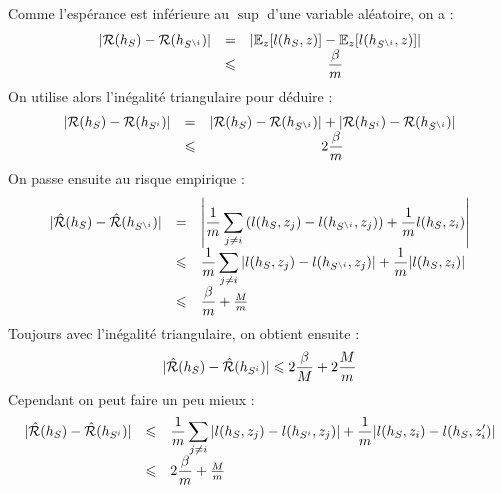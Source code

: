
\dem
Comme l'espérance est inférieure au $\sup$ d'une variable aléatoire, on a :
$$ \begin{array}{llc}
	| \mathcal{R}(h_S) - \mathcal{R}(h_{S^{\setminus i}}) | & = & \left| \mathbb{E}_z[l(h_S, z)] - \mathbb{E}_z[l(h_{S^{\setminus i}}, z)] \right| \\
	 & \leqslant & \dfrac{\beta}{m}
\end{array} $$
On utilise alors l'inégalité triangulaire pour déduire :
$$ \begin{array}{llc}
| \mathcal{R}(h_S) - \mathcal{R}(h_{S^{i}}) | & = & | \mathcal{R}(h_S) - \mathcal{R}(h_{S^{\setminus i}}) | + | \mathcal{R}(h_{S^i}) - \mathcal{R}(h_{S^{\setminus i}}) | \\
& \leqslant & 2 \dfrac{\beta}{m}
\end{array} $$
On passe ensuite au risque empirique :
$$ \begin{array}{lll}
	| \hat{\mathcal{R}}(h_S) - \hat{\mathcal{R}}(h_{S^{\setminus i}}) |
	 & = & \left| \displaystyle \dfrac{1}{m} \sum_{j \neq i} \left( l(h_S, z_j) - l(h_{S^{\setminus i}}, z_j) \right) + \dfrac{1}{m} l(h_S, z_i) \right| \\
	 & \leqslant & \displaystyle \dfrac{1}{m} \sum_{j \neq i} \left| l(h_S, z_j) - l(h_{S^{\setminus i}}, z_j) \right| + \dfrac{1}{m} | l(h_S, z_i) | \\
	 & \leqslant & \dfrac{\beta}{m} + \frac{M}{m}
\end{array}$$
Toujours avec l'inégalité triangulaire, on obtient ensuite :
$$ | \hat{\mathcal{R}}(h_S) - \hat{\mathcal{R}}(h_{S^{i}}) | \leqslant 2 \dfrac{\beta}{M} + 2 \dfrac{M}{m} $$
Cependant on peut faire un peu mieux :
$$ \begin{array}{lll}
	| \hat{\mathcal{R}}(h_S) - \hat{\mathcal{R}}(h_{S^{i}}) |
	& \leqslant & \displaystyle \dfrac{1}{m} \sum_{j \neq i} \left| l(h_S, z_j) - l(h_{S^{ i}}, z_j) \right| + \dfrac{1}{m} | l(h_S, z_i) - l(h_S, z_i^\prime) | \\
	& \leqslant & 2 \dfrac{\beta}{m} + \frac{M}{m}
\end{array}$$
